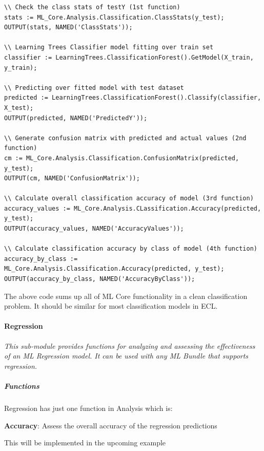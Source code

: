 \begin{lstlisting}
\\ Check the class stats of testY (1st function)
stats := ML_Core.Analysis.Classification.ClassStats(y_test);
OUTPUT(stats, NAMED('ClassStats'));

\\ Learning Trees Classifier model fitting over train set
classifier := LearningTrees.ClassificationForest().GetModel(X_train, y_train);

\\ Predicting over fitted model with test dataset
predicted := LearningTrees.ClassificationForest().Classify(classifier, X_test);
OUTPUT(predicted, NAMED('PredictedY'));

\\ Generate confusion matrix with predicted and actual values (2nd function)
cm := ML_Core.Analysis.Classification.ConfusionMatrix(predicted, y_test);
OUTPUT(cm, NAMED('ConfusionMatrix'));

\\ Calculate overall classification accuracy of model (3rd function)
accuracy_values := ML_Core.Analysis.CLassification.Accuracy(predicted, y_test);
OUTPUT(accuracy_values, NAMED('AccuracyValues'));

\\ Calculate classification accuracy by class of model (4th function)
accuracy_by_class := ML_Core.Analysis.Classification.Accuracy(predicted, y_test);
OUTPUT(accuracy_by_class, NAMED('AccuracyByClass'));
\end{lstlisting}

The above code sums up all of ML Core functionality in a clean classification problem. It should be similar for most classification models in ECL.

\paragraph{Regression}\label{analysis:regression}

\textit{This sub-module provides functions for analyzing and assessing the effectiveness of an ML Regression model. It can be used with any ML Bundle that supports regression.}

\subparagraph{Functions}

Regression has just one function in Analysis which is:

\textbf{Accuracy}: Assess the overall accuracy of the regression predictions

This will be implemented in the upcoming example

